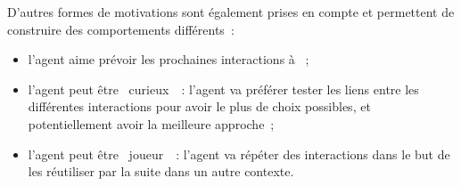 \documentclass{llncs}
\begin{document}
D'autres formes de motivations sont également prises en compte et permettent de construire des comportements différents~:
\begin{itemize}
	\item l'agent aime prévoir les prochaines interactions à \enact~;
	\item l'agent peut être \og~curieux~\fg~: l'agent va préférer tester les liens entre les différentes interactions pour avoir le plus de choix possibles, et potentiellement avoir la meilleure approche~;
	\item l'agent peut être \og~joueur~\fg~: l'agent va répéter des interactions dans le but de les réutiliser par la suite dans un autre contexte. 
\end{itemize}




%
%	
%
\end{document}
